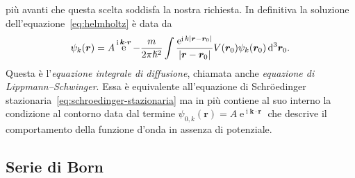 \documentclass[a4paper,fleqn,twoside,12pt]{article}
\newcommand*{\dd}{\mathop{}\!\mathrm{d}} %
\DeclareMathOperator{\e}{\mathrm{e}} %
\DeclareMathOperator{\uimm}{\mathrm{i}} %
\DeclarePairedDelimiter{\abs}{\lvert}{\rvert}
\begin{document}
più avanti che questa scelta soddisfa la nostra richiesta.  In definitiva la
soluzione dell'equazione~\eqref{eq:helmholtz} è data da
\begin{equation}
  \label{eq:lippmann-schwinger}
  \psi_{k}(\bm{r}) = A\e^{\uimm \bm{k}\cdot\bm{r}} - \frac{m}{2\pi\hslash^{2}}
  \int \frac{\e^{\uimm k\abs{\bm{r} - \bm{r}_{0}}}}{\abs{\bm{r} - \bm{r}_{0}}}
  V(\bm{r}_{0}) \psi_{k}(\bm{r}_{0}) \dd^{3}\bm{r}_{0}.
\end{equation}
Questa è l'\emph{equazione integrale di diffusione}, chiamata anche
\emph{equazione di Lippmann–Schwinger}.  Essa è equivalente all'equazione di
Schröedinger stazionaria~\eqref{eq:schroedinger-stazionaria} ma in più contiene
al suo interno la condizione al contorno data dal termine
$\psi_{0,k}(\bm{r}) = A\e^{\uimm \bm{k}\cdot\bm{r}}$ che descrive il
comportamento della funzione d'onda in assenza di potenziale.

\subsection{Serie di Born}
\label{sec:serie-born}
\end{document}
